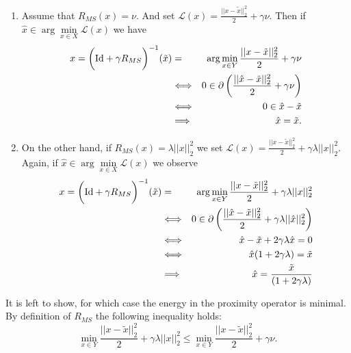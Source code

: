         \begin{enumerate}
            \item Assume that $R_{MS}(x) = \nu$. And set $\mathcal{L}(x) = \frac{||x - \tilde{x}||_{2}^{2}}{2} + \gamma\nu$. Then if $\hat{x} \in \arg\min\limits_{x \in X} \mathcal{L}(x)$ we have
                \begin{eqnarray}
                    x = \bigg( \textnormal{Id} + \gamma R_{MS} \bigg)^{-1}(\tilde{x}) &=& \arg \min_{x \in Y} \frac{||x - \tilde{x}||_{2}^{2}}{2} + \gamma\nu \notag \\
                    &\Longleftrightarrow& 0 \in \partial \left( \frac{||\hat{x} - \tilde{x}||_{2}^{2}}{2} + \gamma\nu \right) \notag \\
                    &\Longleftrightarrow& 0 \in \hat{x} - \tilde{x} \notag \\
                    &\Longrightarrow& \hat{x} = \tilde{x}. \notag
                \end{eqnarray}
            \item On the other hand, if $R_{MS}(x) = \lambda ||x||_{2}^{2}$ we set $\mathcal{L}(x) = \frac{||x - \tilde{x}||_{2}^{2}}{2} + \gamma \lambda ||x||_{2}^{2}$. Again, if $\hat{x} \in \arg\min\limits_{x \in X} \mathcal{L}(x)$ we observe
                \begin{eqnarray}
                    x = \bigg( \textnormal{Id} + \gamma R_{MS} \bigg)^{-1}(\tilde{x}) &=& \arg \min_{x \in Y} \frac{||x - \tilde{x}||_{2}^{2}}{2} + \gamma \lambda ||x||_{2}^{2} \notag \\
                    &\Longleftrightarrow& 0 \in \partial \left( \frac{||\hat{x} - \tilde{x}||_{2}^{2}}{2} + \gamma \lambda ||\hat{x}||_{2}^{2} \right) \notag \\
                    &\Longleftrightarrow& \hat{x} - \tilde{x} + 2 \gamma \lambda \hat{x} = 0 \notag \\
                    &\Longleftrightarrow& \hat{x} (1 + 2\gamma \lambda) = \tilde{x} \notag \\
                    &\Longrightarrow& \hat{x} = \frac{\tilde{x}}{(1 + 2\gamma \lambda)} \notag
                \end{eqnarray}
        \end{enumerate}
        It is left to show, for which case the energy in the proximity operator is minimal. By definition of  $R_{MS}$ the following inequality holds:
            \begin{equation}
                \min_{x \in Y} \frac{||x - \tilde{x}||_{2}^{2}}{2} + \gamma \lambda ||x||_{2}^{2} \le \min_{x \in Y} \frac{||x - \tilde{x}||_{2}^{2}}{2} + \gamma\nu.
                \label{eq:minimal_energy}
            \end{equation}
